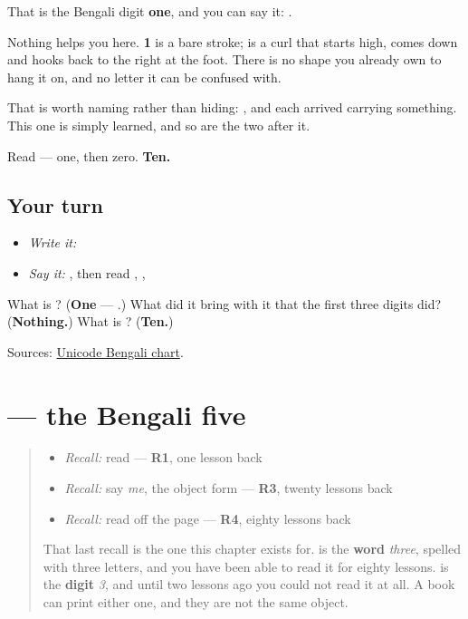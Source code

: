 That is the Bengali digit \textbf{one}, and you can say it: \textbf{}.

Nothing helps you here. \textbf{1} is a bare stroke; \textbf{} is a curl that starts high, comes down and hooks back to the right at the foot. There is no shape you already own to hang it on, and no letter it can be confused with.

That is worth naming rather than hiding: \textbf{}, \textbf{} and \textbf{} each arrived carrying something. This one is simply learned, and so are the two after it.

Read \textbf{} — one, then zero. \textbf{Ten.}

\subsection*{Your turn}
\begin{itemize}
\raggedright
  \item \emph{Write it:} 
  \item \emph{Say it:} \textbf{}, then read \textbf{}, \textbf{}, \textbf{}
\end{itemize}

\begin{tcolorbox}[breakable,colback=teal!4,colframe=teal!35!black,title={Before you move on}]
What is \textbf{}? (\textbf{One} — \textbf{}.) What did it bring with it that the first three digits did? (\textbf{Nothing.}) What is \textbf{}? (\textbf{Ten.})

Sources: \href{https://www.unicode.org/charts/PDF/U0980.pdf}{Unicode Bengali chart}.
\end{tcolorbox}
\section[\texorpdfstring{\bn{৫} (digit five)}{৫ (digit five)}]{ — the Bengali five}

\label{lesson:BN-W07-digit-five}



\begin{quote}
\begin{itemize}
\raggedright
  \item \emph{Recall:} read \textbf{} — \textbf{R1}, one lesson back
  \item \emph{Recall:} say \emph{me}, the object form — \textbf{R3}, twenty lessons back
  \item \emph{Recall:} read \textbf{} off the page — \textbf{R4}, eighty lessons back
\end{itemize}

That last recall is the one this chapter exists for. \textbf{} is the \textbf{word} \emph{three}, spelled with three letters, and you have been able to read it for eighty lessons. \textbf{} is the \textbf{digit} \emph{3}, and until two lessons ago you could not read it at all. A book can print either one, and they are not the same object.
\end{quote}

